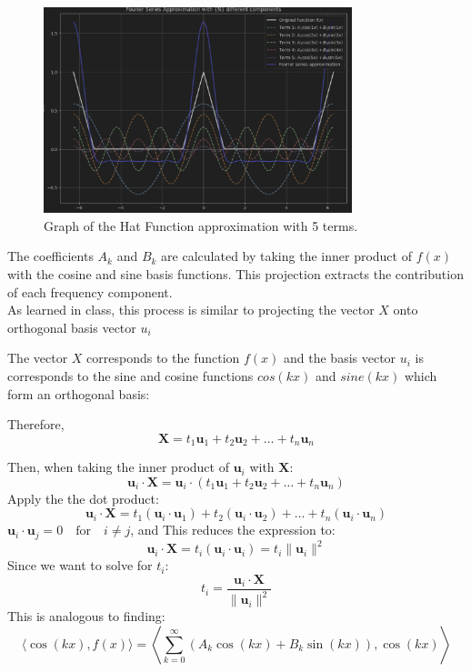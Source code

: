 \documentclass{article}
\begin{document}
\begin{itemize}
{\begin{verbatim}
    \end{verbatim}
     \begin{figure}[H] 
    \centering
    \includegraphics[width=0.8\textwidth]{image2.png}
    \caption{Graph of the Hat Function approximation with 5 terms.}
    \label{fig:hat_function}
    \end{figure}
    
    The coefficients \( A_k \) and \( B_k \) are calculated by taking the inner product of \( f(x) \) with the cosine and sine basis functions.  
    This projection extracts the contribution of each frequency component. \\

    As learned in class, this process is similar to projecting the vector $X$ onto orthogonal basis vector $u_i$

    The vector $X$ corresponds to the function $f(x)$ and the basis vector $u_i$ is corresponds to the sine and cosine functions $cos(kx)$ and $sine(kx)$ which form an orthogonal basis: 

    Therefore, 
\[
\mathbf{X} = t_1 \mathbf{u}_1 + t_2 \mathbf{u}_2 + \dots + t_n \mathbf{u}_n
\]

Then, when taking the inner product of \( \mathbf{u}_i \) with \( \mathbf{X} \):
\[
\mathbf{u}_i \cdot \mathbf{X} = \mathbf{u}_i \cdot (t_1 \mathbf{u}_1 + t_2 \mathbf{u}_2 + \dots + t_n \mathbf{u}_n)
\]
Apply the the dot product:
\[
\mathbf{u}_i \cdot \mathbf{X} = t_1 (\mathbf{u}_i \cdot \mathbf{u}_1) + t_2 (\mathbf{u}_i \cdot \mathbf{u}_2) + \dots + t_n (\mathbf{u}_i \cdot \mathbf{u}_n)
\]
$\mathbf{u}_i \cdot \mathbf{u}_j = 0 \quad \text{for} \quad i \neq j$, and
This reduces the expression to:
\[
\mathbf{u}_i \cdot \mathbf{X} = t_i (\mathbf{u}_i \cdot \mathbf{u}_i) = t_i \|\mathbf{u}_i\|^2
\]
Since we want to solve for \( t_i \):
\[
t_i = \frac{\mathbf{u}_i \cdot \mathbf{X}}{\|\mathbf{u}_i\|^2}
\]
This is analogous to finding:
\[
\langle \cos(kx), f(x) \rangle = \left\langle \sum_{k=0}^\infty \left(A_k \cos(kx) + B_k \sin(kx)\right), \cos(kx) \right\rangle
\]

}
\end{itemize}
\end{document}
